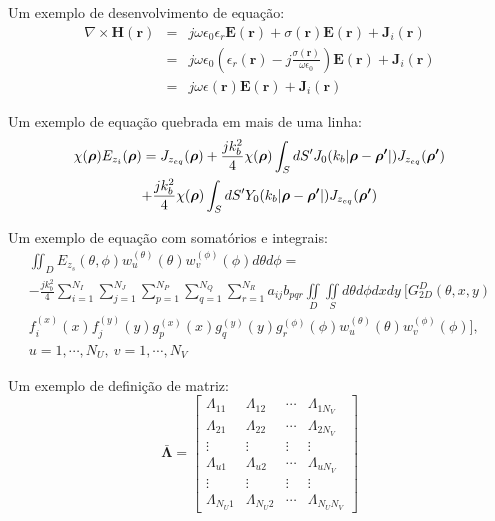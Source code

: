 		Um exemplo de desenvolvimento de equação:
		\begin{eqnarray}
			\nabla\times\mathbf{H}(\mathbf{r}) &=&  j\omega\epsilon_0\epsilon_r\mathbf{E}(\mathbf{r}) + \sigma(\mathbf{r})\mathbf{E}(\mathbf{r})+ \mathbf{J}_i(\mathbf{r}) \label{eq:2:complexmedia:1} \\
			 &=&  j\omega\epsilon_0\left(\epsilon_r(\mathbf{r}) -j\frac{\sigma(\mathbf{r})}{\omega\epsilon_0}\right)\mathbf{E}(\mathbf{r}) +  \mathbf{J}_i(\mathbf{r}) \label{eq:2:complexmedia:2} \\
			&=&  j\omega\epsilon(\mathbf{r})\mathbf{E}(\mathbf{r}) +  \mathbf{J}_i(\mathbf{r}) \label{eq:2:complexmedia:3}
		\end{eqnarray}

		Um exemplo de equação quebrada em mais de uma linha:
		\begin{multline}
			\chi(\boldsymbol{\rho})E_{z_i}(\boldsymbol{\rho}) = J_{z_{eq}}(\boldsymbol{\rho}) + \frac{jk_b^2}{4} \chi(\boldsymbol{\rho}) \int_S dS^\prime J_0(k_b|\boldsymbol{\rho}-\boldsymbol{\rho^\prime}|) J_{z_{eq}}(\boldsymbol{\rho^\prime}) \\ + \frac{jk_b^2}{4} \chi(\boldsymbol{\rho}) \int_S dS^\prime Y_0(k_b|\boldsymbol{\rho}-\boldsymbol{\rho^\prime}|) J_{z_{eq}}(\boldsymbol{\rho^\prime})  \label{eq:2:2d:greendecomp:csie}
		\end{multline}

		Um exemplo de equação com somatórios e integrais:
		\begin{multline}
			\iint_D E_{z_s}(\theta,\phi) w^{(\theta)}_u(\theta) w^{(\phi)}_v(\phi) d\theta d\phi = \\ -\frac{jk_b^2}{4} \sum\limits_{i=1}^{N_I}\sum\limits_{j=1}^{N_J} \sum\limits_{p=1}^{N_P}\sum\limits_{q=1}^{N_Q}\sum\limits_{r=1}^{N_R} a_{ij} b_{pqr} \iint\limits_{D} \iint\limits_{S} d\theta d\phi dxdy~ \bigg[ G^D_{2D}(\theta,x,y) \\ f^{(x)}_i(x) f^{(y)}_j(y) g^{(x)}_{p}(x) g^{(y)}_{q}(y) g^{(\phi)}_r(\phi)w^{(\theta)}_u(\theta) w^{(\phi)}_v(\phi)  \bigg], \\ u = 1,\cdots, N_U,~ v = 1,\cdots,N_V \label{eq:3:discretization:6}
		\end{multline}

		Um exemplo de definição de matriz:
		\begin{equation}
			\boldsymbol{\bar{\Lambda}} = \begin{bmatrix}
																\Lambda_{11} & \Lambda_{12} & \cdots & \Lambda_{1N_V} \\
															   \Lambda_{21} & \Lambda_{22} & \cdots & \Lambda_{2N_V} \\
															   \vdots & \vdots & \vdots & \vdots \\
															   \Lambda_{u1} & \Lambda_{u2} & \cdots & \Lambda_{uN_V} \\
															   \vdots & \vdots & \vdots & \vdots \\
															   \Lambda_{N_U1} & \Lambda_{N_U2} & \cdots & \Lambda_{N_UN_V}
															  \end{bmatrix} \label{eq:discretization:9}
	   \end{equation}

